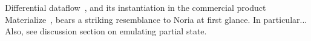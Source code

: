 \begin{comment}
http://www.vldb.org/pvldb/vol13/p1793-mcsherry.pdf
https://www.inf.ufrgs.br/prosoft/publications/2016/mertz-tse-2016-pre-print.pdf
https://people.csail.mit.edu/nickolai/papers/gupta-cachegenie.pdf
\end{comment}

Differential dataflow~\cite{naiad,differential-dataflow}, and its instantiation
in the commercial product Materialize~\cite{materialize}, bears a striking
resemblance to Noria at first glance. In particular... Also, see discussion
section on emulating partial state.
